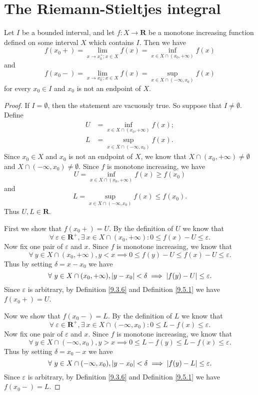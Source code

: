 \section{The Riemann-Stieltjes integral}\label{sec 11.8}

\begin{additional corollary}\label{ac 11.8.1}
Let \(I\) be a bounded interval, and let \(f : X \to \mathbf{R}\) be a monotone increasing function defined on some interval \(X\) which contains \(I\).
Then we have
\[
    f(x_0+) = \lim_{x \to x_0^+ ; x \in X} f(x) = \inf_{x \in X \cap (x_0, +\infty)} f(x)
\]
and
\[
    f(x_0-) = \lim_{x \to x_0^- ; x \in X} f(x) = \sup_{x \in X \cap (-\infty, x_0)} f(x)
\]
for every \(x_0 \in I\) and \(x_0\) is not an endpoint of \(X\).
\end{additional corollary}

\begin{proof}
    If \(I = \emptyset\), then the statement are vacuously true.
    So suppose that \(I \neq \emptyset\).
    Define
    \begin{align*}
        U & = \inf_{x \in X \cap (x_0, +\infty)} f(x); \\
        L & = \sup_{x \in X \cap (-\infty, x_0)} f(x).
    \end{align*}
    Since \(x_0 \in X\) and \(x_0\) is not an endpoint of \(X\), we know that \(X \cap (x_0, +\infty) \neq \emptyset\) and \(X \cap (-\infty, x_0) \neq \emptyset\).
    Since \(f\) is monotone increasing, we have
    \[
        U = \inf_{x \in X \cap (x_0, +\infty)} f(x) \geq f(x_0)
    \]
    and
    \[
        L = \sup_{x \in X \cap (-\infty, x_0)} f(x) \leq f(x_0).
    \]
    Thus \(U, L \in \mathbf{R}\).

    First we show that \(f(x_0+) = U\).
    By the definition of \(U\) we know that
    \[
        \forall\ \varepsilon \in \mathbf{R}^+, \exists\ x \in X \cap (x_0, +\infty) : 0 \leq f(x) - U \leq \varepsilon.
    \]
    Now fix one pair of \(\varepsilon\) and \(x\).
    Since \(f\) is monotone increasing, we know that
    \[
        \forall\ y \in X \cap (x_0, +\infty), y < x \implies 0 \leq f(y) - U \leq f(x) - U \leq \varepsilon.
    \]
    Thus by setting \(\delta = x - x_0\) we have
    \[
        \forall\ y \in X \cap (x_0, +\infty), \abs*{y - x_0} < \delta \implies \abs*{f(y) - U} \leq \varepsilon.
    \]
    Since \(\varepsilon\) is arbitrary, by Definition \ref{9.3.6} and Definition \ref{9.5.1} we have \(f(x_0+) = U\).

    Now we show that \(f(x_0-) = L\).
    By the definition of \(L\) we know that
    \[
        \forall\ \varepsilon \in \mathbf{R}^+, \exists\ x \in X \cap (-\infty, x_0) : 0 \leq L - f(x) \leq \varepsilon.
    \]
    Now fix one pair of \(\varepsilon\) and \(x\).
    Since \(f\) is monotone increasing, we know that
    \[
        \forall\ y \in X \cap (-\infty, x_0), y > x \implies 0 \leq L - f(y) \leq L - f(x) \leq \varepsilon.
    \]
    Thus by setting \(\delta = x_0 - x\) we have
    \[
        \forall\ y \in X \cap (-\infty, x_0), \abs*{y - x_0} < \delta \implies \abs*{f(y) - L} \leq \varepsilon.
    \]
    Since \(\varepsilon\) is arbitrary, by Definition \ref{9.3.6} and Definition \ref{9.5.1} we have \(f(x_0-) = L\).
\end{proof}

